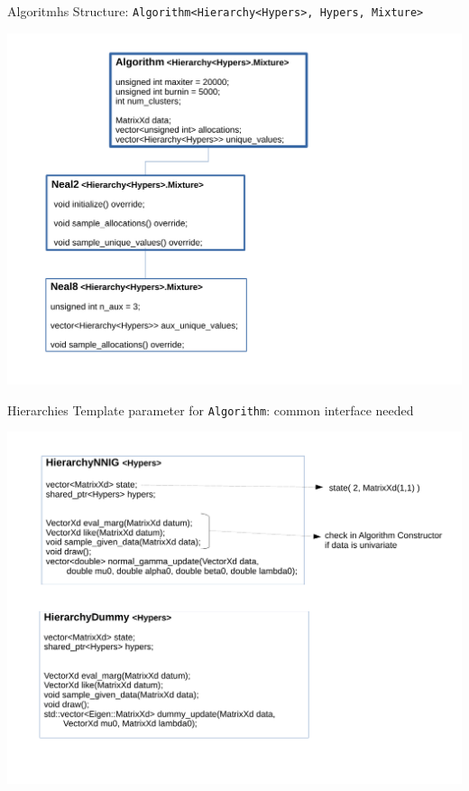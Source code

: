 

\begin{frame}[fragile]{Algoritmhs}
Structure: \texttt{Algorithm<Hierarchy<Hypers>, Hypers, Mixture>}
\begin{center}
	\includegraphics[scale=0.35]{etc/algo.pdf}
\end{center}
\end{frame}

\begin{frame}{Hierarchies}
Template parameter for \texttt{Algorithm}: common interface needed
\begin{center}
	\includegraphics[scale=0.35]{etc/hierarchy.pdf}
\end{center}

\end{frame}

